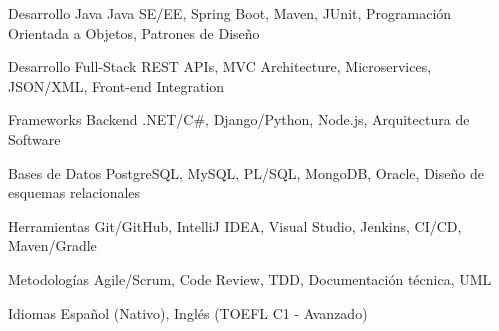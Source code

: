 
\begin{cvskills}

  \cvskill
    {Desarrollo Java}
    {Java SE/EE, Spring Boot, Maven, JUnit, Programación Orientada a Objetos, Patrones de Diseño}

  \cvskill
    {Desarrollo Full-Stack}
    {REST APIs, MVC Architecture, Microservices, JSON/XML, Front-end Integration}

  \cvskill
    {Frameworks Backend}
    {.NET/C\#, Django/Python, Node.js, Arquitectura de Software}

  \cvskill
    {Bases de Datos}
    {PostgreSQL, MySQL, PL/SQL, MongoDB, Oracle, Diseño de esquemas relacionales}

  \cvskill
    {Herramientas}
    {Git/GitHub, IntelliJ IDEA, Visual Studio, Jenkins, CI/CD, Maven/Gradle}

  \cvskill
    {Metodologías}
    {Agile/Scrum, Code Review, TDD, Documentación técnica, UML}

  \cvskill
    {Idiomas}
    {Español (Nativo), Inglés (TOEFL C1 - Avanzado)}

\end{cvskills}
